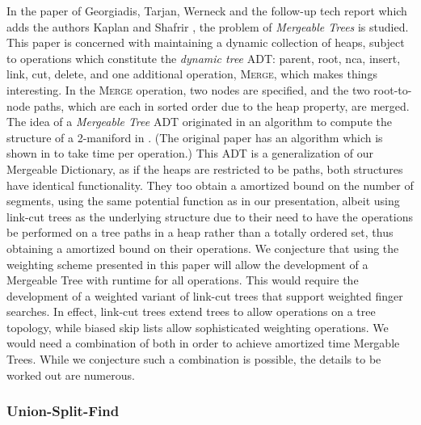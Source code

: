 \documentclass[11pt]{article}
\newcommand{\Ds}{Mergeable Dictionary}
\newcommand{\kwUnion}{Merge}
\newcommand{\Union}{\mbox{\textsc{\kwUnion{}}}}
\newcommand{\segments}{{\segment}s}
\newcommand{\segment}{segment}
\newcommand{\op}[1]{#1}
\begin{document}
In the paper of Georgiadis, Tarjan, Werneck \cite{conf/soda/GeorgiadisTW06} and the follow-up tech report which adds the authors Kaplan and Shafrir \cite{DBLP:journals/talg/GeorgiadisKSTW11}, the problem of \emph{Mergeable Trees} is studied. This paper is concerned with maintaining a dynamic collection of heaps, subject to operations which constitute the \emph{dynamic tree} ADT: \op{parent}, \op{root}, \op{nca}, \op{insert}, \op{link}, \op{cut}, \op{delete}, and one additional operation, \Union{}, which makes things interesting. In the \Union{} operation, two nodes are specified, and the two root-to-node paths, which are each in sorted order due to the heap property, are merged. The idea of a \emph{Mergeable Tree} ADT originated in an algorithm to compute the structure of a 2-maniford in . (The original paper has an algorithm which is shown in \cite{journals/dcg/AgarwalEHW06} to take time  per operation.) 
This ADT is a generalization of our \Ds{}, as if the heaps are restricted to be paths, both structures have identical functionality. They too obtain a  amortized bound on the number of \segments{}, using the same potential function as in our  presentation, albeit using link-cut trees \cite{journals/jcss/SleatorT83} as the underlying  structure due to their need to have the operations be performed on a tree paths in a heap rather than a totally ordered set, thus obtaining a  amortized bound on their operations. We conjecture that using the weighting scheme presented in this paper will allow the development of a Mergeable Tree with  runtime for all operations. This would require the development of a weighted variant of link-cut trees that support weighted finger searches. In effect, link-cut trees extend  trees to allow operations on a tree topology, while biased skip lists allow sophisticated weighting operations. We would need a combination of both in order to achieve  amortized time Mergable Trees. While we conjecture such a combination is possible, the details to be worked out are numerous. 

\subsubsection{Union-Split-Find} 
\end{document}
